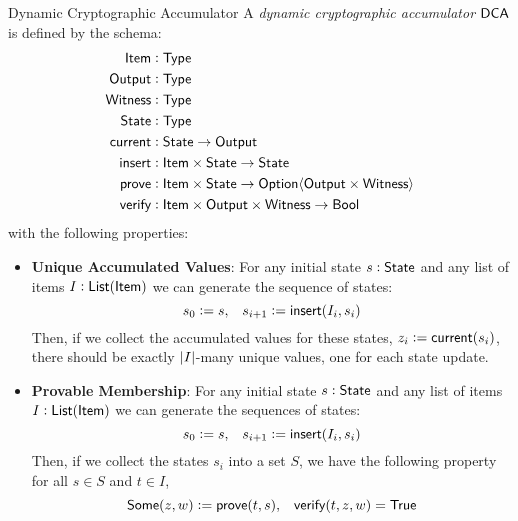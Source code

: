 \begin{definitiontoc}{Dynamic Cryptographic Accumulator}
    A \emph{dynamic cryptographic accumulator} ${\textsf{DCA}}$ is defined by the schema:
    \begin{align*}
        {\textsf{Item}}    &: {\textsf{Type}} \\
        {\textsf{Output}}  &: {\textsf{Type}} \\
        {\textsf{Witness}} &: {\textsf{Type}} \\
        {\textsf{State}}  &: {\textsf{Type}} \\
        {\textsf{current}} &: {\textsf{State}} \to {\textsf{Output}} \\
        {\textsf{insert}} &: {\textsf{Item}} \times {\textsf{State}} \to {\textsf{State}} \\
        {\textsf{prove}}   &: {\textsf{Item}} \times {\textsf{State}} \to {\textsf{Option}}\langle{{\textsf{Output}}\times {\textsf{Witness}}}\rangle \\
        {\textsf{verify}}  &: {\textsf{Item}} \times {\textsf{Output}} \times {\textsf{Witness}} \to {\textsf{Bool}}
    \end{align*}
    with the following properties:
    \begin{itemize}
        \item \textbf{Unique Accumulated Values}: For any initial state $s : {\textsf{State}}$ and any list of items $I : {\textsf{List}}({\textsf{Item}})$ we can generate the sequence of states:
            \[s_0 := s, \,\,\,\,\, s_{i + 1} := {\textsf{insert}}(I_i, s_i)\]
            Then, if we collect the accumulated values for these states, $z_i := {\textsf{current}}(s_i)$, there should be exactly $\left|I\right|$-many unique values, one for each state update.
        \item \textbf{Provable Membership}: For any initial state $s : {\textsf{State}}$ and any list of items $I : {\textsf{List}}({\textsf{Item}})$ we can generate the sequences of states:
            \[s_0 := s, \,\,\,\,\, s_{i + 1} := {\textsf{insert}}(I_i, s_i)\]
            Then, if we collect the states $s_i$ into a set $S$, we have the following property for all $s \in S$ and $t \in I$,
            \[{\textsf{Some}}(z, w) := {\textsf{prove}}(t, s), \,\,\,\,\, {\textsf{verify}}(t, z, w) = {\textsf{True}}\]
    \end{itemize}
\end{definitiontoc}

